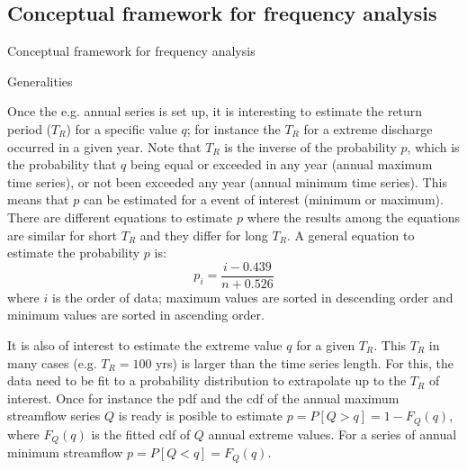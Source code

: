 \documentclass[8pt]{beamer}
\renewcommand{\emph}[1]{\textcolor{myorange}{#1}}
\begin{document}
\subsection{Conceptual framework for  frequency analysis}
\begin{frame}{Conceptual framework for  frequency analysis}
    \begin{block}{Generalities}
   \end{block}

        Once the e.g. annual series is set up, it is interesting to estimate the \emph{return period} ($T_R$) for a specific value $q$; for instance the $T_R$ for a extreme discharge occurred in a given year. Note that $T_R$ is the inverse of the probability $p$, which is the probability that $q$ being equal or exceeded in any year (annual maximum time series), or not been exceeded  any year (annual minimum time series). This means that $p$ can be estimated for a event of interest (minimum or maximum). There are different equations to estimate $p$ where the results among the equations are similar for short $T_R$ and they differ for long $T_R$. A general equation to estimate the probability $p$ is:
        \[
            p_i = \frac{i-0.439}{n+0.526}
        \]
        where $i$ is the order of data; maximum values are sorted in descending order and minimum values are sorted in ascending order. 

        It is also of interest to estimate the extreme value $q$ for a given $T_R$. This $T_R$ in many cases (e.g. $T_R = 100$ yrs) is larger than the time series length. For this, the data need to be fit to a probability distribution to extrapolate up to the $T_R$ of interest. Once for instance the \emph{pdf} and the \emph{cdf} of the annual maximum streamflow series $Q$ is ready is posible to estimate  $p = P[Q > q] = 1 - F_Q (q)$, where $F_Q (q)$ is the fitted \emph{cdf} of $Q$ annual extreme values. For a series of annual minimum streamflow $p = P[Q<q] = F_Q (q)$. 
\end{frame}
\end{document}
